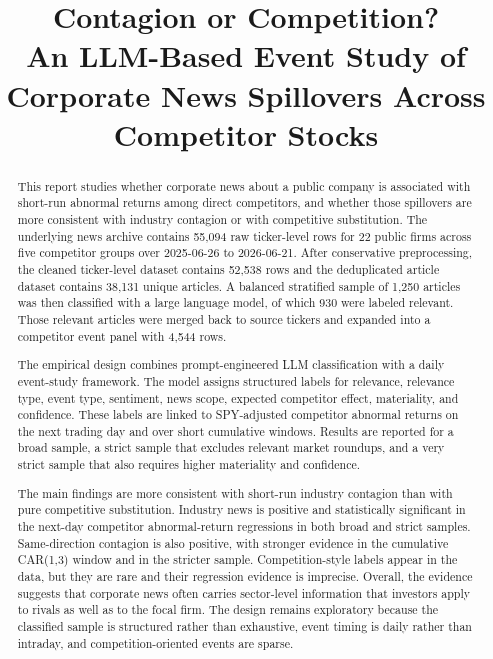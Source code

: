 \documentclass[11pt]{article}
\title{Contagion or Competition?\\An LLM-Based Event Study of Corporate News Spillovers Across Competitor Stocks}
\author{}
\date{}
\begin{document}
\maketitle

\begin{abstract}
This report studies whether corporate news about a public company is associated with short-run abnormal returns among direct competitors, and whether those spillovers are more consistent with industry contagion or with competitive substitution. The underlying news archive contains 55,094 raw ticker-level rows for 22 public firms across five competitor groups over 2025-06-26 to 2026-06-21. After conservative preprocessing, the cleaned ticker-level dataset contains 52,538 rows and the deduplicated article dataset contains 38,131 unique articles. A balanced stratified sample of 1,250 articles was then classified with a large language model, of which 930 were labeled relevant. Those relevant articles were merged back to source tickers and expanded into a competitor event panel with 4,544 rows.

The empirical design combines prompt-engineered LLM classification with a daily event-study framework. The model assigns structured labels for relevance, relevance type, event type, sentiment, news scope, expected competitor effect, materiality, and confidence. These labels are linked to SPY-adjusted competitor abnormal returns on the next trading day and over short cumulative windows. Results are reported for a broad sample, a strict sample that excludes relevant market roundups, and a very strict sample that also requires higher materiality and confidence.

The main findings are more consistent with short-run industry contagion than with pure competitive substitution. Industry news is positive and statistically significant in the next-day competitor abnormal-return regressions in both broad and strict samples. Same-direction contagion is also positive, with stronger evidence in the cumulative CAR(1,3) window and in the stricter sample. Competition-style labels appear in the data, but they are rare and their regression evidence is imprecise. Overall, the evidence suggests that corporate news often carries sector-level information that investors apply to rivals as well as to the focal firm. The design remains exploratory because the classified sample is structured rather than exhaustive, event timing is daily rather than intraday, and competition-oriented events are sparse.
\end{abstract}
\end{document}

